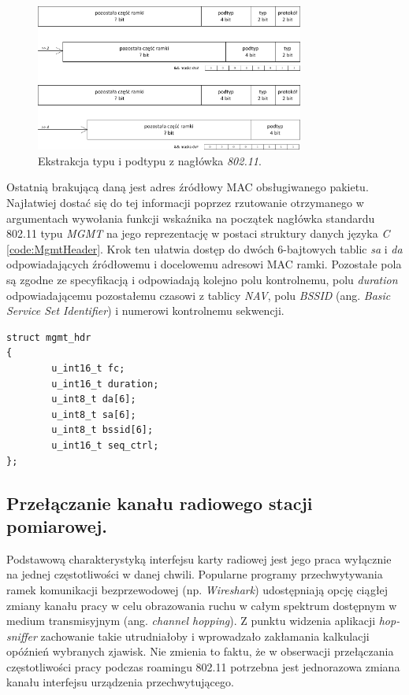 \begin{figure}[htb]
\begin{center}
\includegraphics[width=333px]{img/TypeSubtype}
\caption{Ekstrakcja typu i podtypu z nagłówka \emph{802.11}.}
\label{TypeSubtype}
\end{center}
\end{figure}

Ostatnią brakującą daną jest adres źródłowy MAC obsługiwanego pakietu. Najłatwiej dostać się do tej informacji poprzez rzutowanie otrzymanego w argumentach wywołania funkcji wskaźnika na początek nagłówka standardu 802.11 typu \emph{MGMT} na jego reprezentację w postaci struktury danych języka \emph{C} \ref{code:MgmtHeader}. Krok ten ułatwia dostęp do dwóch 6-bajtowych tablic \emph{sa} i \emph{da} odpowiadających źródłowemu i docelowemu adresowi MAC ramki. Pozostałe pola są zgodne ze specyfikacją i odpowiadają kolejno polu kontrolnemu, polu \emph{duration} odpowiadającemu pozostałemu czasowi z tablicy \emph{NAV}, polu \emph{BSSID} (ang. \emph{Basic Service Set Identifier}) i numerowi kontrolnemu sekwencji.

\begin{lstlisting}[frame=tb]
struct mgmt_hdr
{
        u_int16_t fc;
        u_int16_t duration;
        u_int8_t da[6];
        u_int8_t sa[6];
        u_int8_t bssid[6];
        u_int16_t seq_ctrl;
};
\end{lstlisting}



\subsection{Przełączanie kanału radiowego stacji pomiarowej.}

Podstawową charakterystyką interfejsu karty radiowej jest jego praca wyłącznie na jednej częstotliwości w danej chwili. Popularne programy przechwytywania ramek komunikacji bezprzewodowej (np. \emph{Wireshark}) udostępniają opcję ciągłej zmiany kanału pracy w celu obrazowania ruchu w całym spektrum dostępnym w medium transmisyjnym (ang. \emph{channel hopping}). Z punktu widzenia aplikacji \emph{hop-sniffer} zachowanie takie utrudniałoby i wprowadzało zakłamania kalkulacji opóźnień wybranych zjawisk. Nie zmienia to faktu, że w obserwacji przełączania częstotliwości pracy podczas roamingu 802.11 potrzebna jest jednorazowa zmiana kanału interfejsu urządzenia przechwytującego.     

